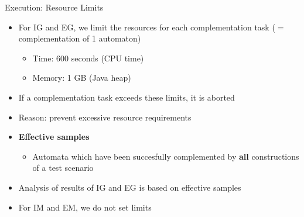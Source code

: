 \documentclass[12pt]{beamer}
\newcommand{\fat}[1]{\textbf{#1}}
\begin{document}
\begin{frame}{Execution: Resource Limits}
\begin{itemize}\itemsep5pt
\item For IG and EG, we limit the resources for each complementation task ($=$ complementation of 1 automaton)
  \begin{itemize}
  \item Time:   \tabto{1.6cm} 600 seconds (CPU time)
  \item Memory: \tabto{1.6cm} 1 GB (Java heap)
  \end{itemize}
\pause
\item If a complementation task exceeds these limits, it is aborted
\pause
\item Reason: prevent excessive resource requirements %
\pause
\item \fat{Effective samples}
  \begin{itemize}
  \item Automata which have been succesfully complemented by \fat{all} constructions of a test scenario
  \end{itemize}
\item Analysis of results of IG and EG is based on effective samples
\pause
\item For IM and EM, we do not set limits
\end{itemize}


\end{frame}
\end{document}
